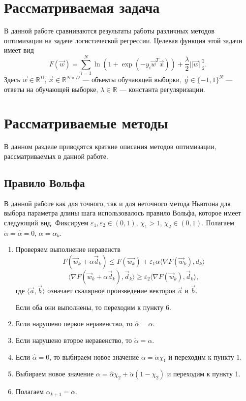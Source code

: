\documentclass[12pt]{article}
\begin{document}
\section{Рассматриваемая задача}

\hspace{0.6cm}В данной работе сравниваются результаты работы различных методов оптимизации на задаче логистической регрессии. Целевая функция этой задачи имеет вид
$$ F(\vec w) = \sum\limits_{i = 1}^{N} \ln(1 + \exp(-y_i \vec w^T \vec x)) + \frac \lambda 2 ||\vec w||_2^2.$$
Здесь $\vec w \in \mathbb{R}^D$, $\vec x \in \mathbb{R}^{N \times D}$ — объекты обучающей выборки, $\vec y \in \{-1, 1\}^N$ — ответы на обучающей выборке, $\lambda \in \mathbb{R}$ — константа регуляризации.

\section{Рассматриваемые методы}

\hspace{0.6cm}В данном разделе приводятся краткие описания методов оптимизации, рассматриваемых в данной работе.

	\subsection{Правило Вольфа}
	
		В данной работе как для точного, так и для неточного метода Ньютона для выбора параметра длины шага использовалось правило Вольфа, которое имеет следующий вид. Фиксируем $\varepsilon_1, \varepsilon_2 \in (0, 1)$, $\chi_1 > 1$, $\chi_2 \in (0, 1)$. Полагаем $\check\alpha = \hat\alpha = 0$, $\alpha = \alpha_{k}$. 
		\begin{enumerate}
			\item Проверяем выполнение неравенств
			$$F(\vec w_k + \alpha \vec d_k) \le F(\vec{w_k}) + \varepsilon_1\alpha \langle \nabla F(\vec w_k), d_k \rangle$$
			$$\langle \nabla F(\vec w_k + \alpha \vec d_k), \vec d_k \rangle \ge \varepsilon_2  \langle \nabla F(\vec w_k), \vec d_k \rangle,$$
			где $\langle \vec{a}, \vec{b} \rangle$ означает скалярное произведение векторов $\vec{a}$ и $\vec{b}$.
			
			Если оба они выполнены, то переходим к пункту 6.
			
			\item Если нарушено первое неравенство, то $\hat\alpha = \alpha$.
			
			\item Если нарушено второе неравенство, то $\check\alpha = \alpha$.
			
			\item Если $\hat \alpha = 0$, то выбираем новое значение $\alpha = \check\alpha \chi_1$ и переходим к пункту 1.
			
			\item Выбираем новое значение $\alpha = \hat\alpha \chi_2 + \check\alpha(1 - \chi_2)$ и переходим к пункту 1.
			
			\item Полагаем $\alpha_{k+1} = \alpha$.
			
		\end{enumerate} 
		
\end{document}
